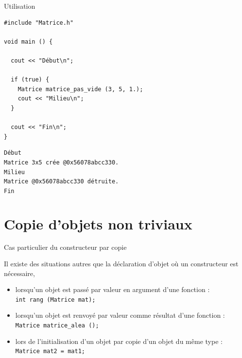 \documentclass[c]{beamer}
\newcommand{\inline}[1]{\texttt{#1}}
\begin{document}

\begin{frame}[fragile]{Utilisation}
\begin{verbatim}
#include "Matrice.h"

void main () {

  cout << "Début\n";

  if (true) {
    Matrice matrice_pas_vide (3, 5, 1.);
    cout << "Milieu\n";
  }

  cout << "Fin\n";
}
\end{verbatim}
\pause
\begin{verbatim}
Début
Matrice 3x5 crée @0x56078abcc330.
Milieu
Matrice @0x56078abcc330 détruite.
Fin
\end{verbatim}

\end{frame}


\part{Copie d'objets non triviaux}
\frame{\partpage}

\begin{frame}[fragile]{Cas particulier du constructeur par copie}

Il existe des situations autres que la déclaration d'objet où un constructeur est nécessaire,

\begin{itemize}[<+->]
\item lorsqu'un objet est passé par valeur en argument d'une fonction : \\ \inline{int rang (Matrice mat);}
\item lorsqu'un objet est renvoyé par valeur comme résultat d'une fonction : \\ \inline{Matrice matrice_alea ();}
\item lors de l'initialisation d'un objet par copie d'un objet du même type : \\ \inline{Matrice mat2 = mat1;}
\end{itemize}

\vspace{1em}

\end{frame}
\end{document}
